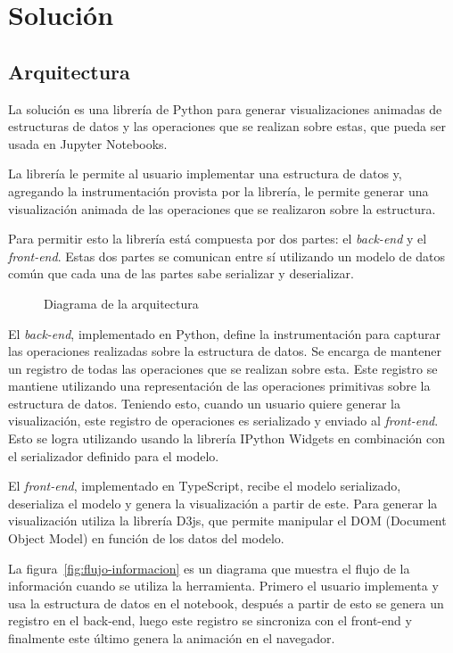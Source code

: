 \chapter{Solución}

\section{Arquitectura}

La solución es una librería de Python para generar visualizaciones animadas de estructuras de datos y las operaciones que se realizan sobre estas, que pueda ser usada en Jupyter Notebooks.

La librería le permite al usuario implementar una estructura de datos y, agregando la instrumentación provista por la librería, le permite generar una visualización animada de las operaciones que se realizaron sobre la estructura.

Para permitir esto la librería está compuesta por dos partes: el \textit{back-end} y el \textit{front-end}. Estas dos partes se comunican entre sí utilizando un modelo de datos común que cada una de las partes sabe serializar y deserializar.

\begin{figure}[htb]
    \centering
    
    \caption{Diagrama de la arquitectura}
    \label{fig:diagrama-arq}
\end{figure}

El \textit{back-end}, implementado en Python, define la instrumentación para capturar las operaciones realizadas sobre la estructura de datos. Se encarga de mantener un registro de todas las operaciones que se realizan sobre esta. Este registro se mantiene utilizando una representación de las operaciones primitivas sobre la estructura de datos. Teniendo esto, cuando un usuario quiere generar la visualización, este registro de operaciones es serializado y enviado al \textit{front-end}. Esto se logra utilizando usando la librería IPython Widgets en combinación con el serializador definido para el modelo.

El \textit{front-end}, implementado en TypeScript, recibe el modelo serializado, deserializa el modelo y genera la visualización a partir de este. Para generar la visualización utiliza la librería D3js, que permite manipular el DOM (Document Object Model) en función de los datos del modelo.

La figura~\ref{fig:flujo-informacion} es un diagrama que muestra el flujo de la información cuando se utiliza la herramienta. Primero el usuario implementa y usa la estructura de datos en el notebook, después a partir de esto se genera un registro en el back-end, luego este registro se sincroniza con el front-end y finalmente este último genera la animación en el navegador.

